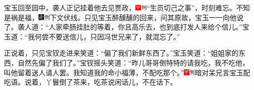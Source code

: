宝玉回至园中，袭人正记挂着他去见贾政，{\includegraphics[width=3mm]{../Images/00002}\includegraphics[width=3mm]{../Images/00011}\footnotesize \kaishu “生员切己之事”，时刻难忘。}不知是祸是福，{\includegraphics[width=3mm]{../Images/00004}\includegraphics[width=3mm]{../Images/00011}\footnotesize \kaishu 下文伏线。}只见宝玉醉醺醺的回来，问其原故，宝玉一一向他说了。袭人道：“人家牵肠挂肚的等着，你且高乐去，也到底打发人来给个信儿。”宝玉道：“我何尝不要送信儿，只因冯世兄来了，就混忘了。”

正说着，只见宝钗走进来笑道：“偏了我们新鲜东西了。”宝玉笑道：“姐姐家的东西，自然先偏了我们了。”宝钗摇头笑道：“昨儿哥哥倒特特的请我吃，我不吃他，叫他留着送人请人罢。我知道我的命小福薄，不配吃那个。”{\includegraphics[width=3mm]{../Images/00002}\includegraphics[width=3mm]{../Images/00011}\footnotesize \kaishu 暗对呆兄言宝玉配吃语。}说着，丫鬟倒了茶来，吃茶说闲话儿，不在话下。


